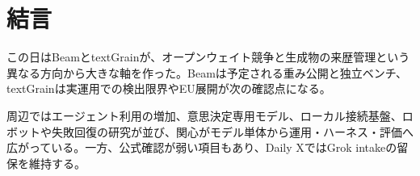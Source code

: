 \section*{結言}
この日はBeamとtextGrainが、オープンウェイト競争と生成物の来歴管理という異なる方向から大きな軸を作った。Beamは予定される重み公開と独立ベンチ、textGrainは実運用での検出限界やEU展開が次の確認点になる。

周辺ではエージェント利用の増加、意思決定専用モデル、ローカル接続基盤、ロボットや失敗回復の研究が並び、関心がモデル単体から運用・ハーネス・評価へ広がっている。一方、公式確認が弱い項目もあり、Daily XではGrok intakeの留保を維持する。
